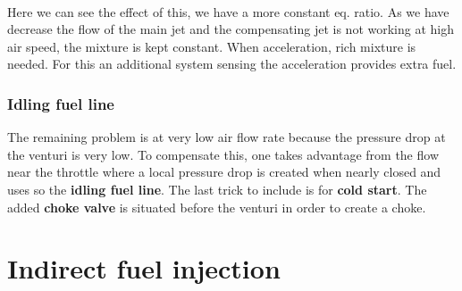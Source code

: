 	\ \\
	
	Here we can see the effect of this, we have a more constant eq. ratio. As we have decrease the flow of the main jet and the compensating jet is not working at high air speed, the mixture is kept constant. When acceleration, rich mixture is needed. For this an additional system sensing the acceleration provides extra fuel. 
	
\subsubsection{Idling fuel line}
	The remaining problem is at very low air flow rate because the pressure drop at the venturi is very low. To compensate this, one takes advantage from the flow near the throttle where a local pressure drop is created when nearly closed and uses so the \textbf{idling fuel line}.  The last trick to include is for \textbf{cold start}. The added \textbf{choke valve} is situated before the venturi in order to create a choke. 
	
\section{Indirect fuel injection}
	